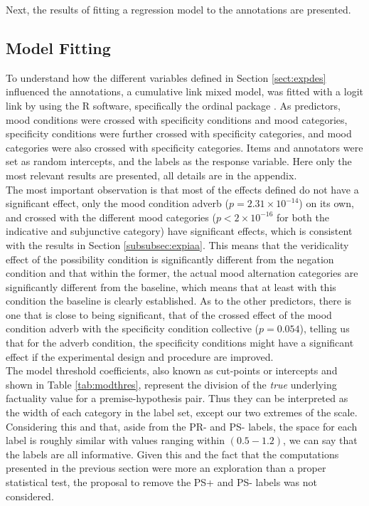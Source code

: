 Next, the results of fitting a regression model to the annotations are presented.

\subsection{Model Fitting}
To understand how the different variables defined in Section \ref{sect:expdes} influenced the annotations, a cumulative link mixed model, was fitted with a logit link by using the R software, specifically the ordinal package \citep{christensen2018cumulative}. As predictors, mood conditions were crossed with specificity conditions and mood categories, specificity conditions were further crossed with specificity categories, and mood categories were also crossed with specificity categories. Items and annotators were set as random intercepts, and the labels as the response variable. Here only the most relevant results are presented, all details are in the appendix.\\

The most important observation is that most of the effects defined do not have a significant effect, only the mood condition adverb ($p=2.31\times10^{-14}$) on its own, and crossed with the different mood categories ($p< 2\times10^{-16}$ for both the indicative and subjunctive category) have significant effects, which is consistent with the results in Section \ref{subsubsec:expiaa}. This means that the veridicality effect of the possibility condition is significantly different from the negation condition and that within the former, the actual mood alternation categories are significantly different from the baseline, which means that at least with this condition the baseline is clearly established. As to the other predictors, there is one that is close to being significant, that of the crossed effect of the mood condition adverb with the specificity condition collective ($p = 0.054$), telling us that for the adverb condition, the specificity conditions might have a significant effect if the experimental design and procedure are improved.\\

The model threshold coefficients, also known as cut-points or intercepts \citep{christensen2018cumulative} and shown in Table \ref{tab:modthres}, represent the division of the \textit{true} underlying factuality value for a premise-hypothesis pair. Thus they can be interpreted as the width of each category in the label set, except our two extremes of the scale. Considering this and that, aside from the PR- and PS- labels, the space for each label is roughly similar with values ranging within $(0.5-1.2)$, we can say that the labels are all informative. Given this and the fact that the computations presented in the previous section were more an exploration than a proper statistical test, the proposal to remove the PS+ and PS- labels was not considered.\\ 


